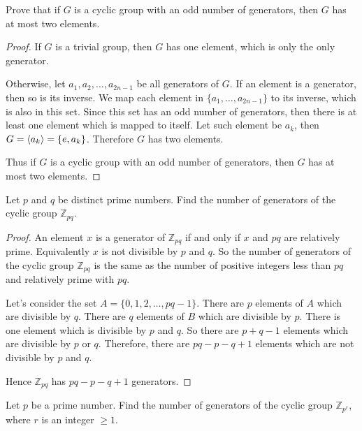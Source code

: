 \begin{exercise}
    Prove that if $G$ is a cyclic group with an odd number of generators, then $G$ has at most two elements.
\end{exercise}

\begin{proof}
    If $G$ is a trivial group, then $G$ has one element, which is only the only generator.

    Otherwise, let $a_{1}, a_{2}, \ldots, a_{2n-1}$ be all generators of $G$. If an element is a generator, then so is its inverse. We map each element in $\{ a_{1}, \ldots, a_{2n-1} \}$ to its inverse, which is also in this set. Since this set has an odd number of generators, then there is at least one element which is mapped to itself. Let such element be $a_{k}$, then $G = \left\langle{a_{k}}\right\rangle = \{ e, a_{k} \}$. Therefore $G$ has two elements.

    Thus if $G$ is a cyclic group with an odd number of generators, then $G$ has at most two elements.
\end{proof}

\begin{exercise}
    Let $p$ and $q$ be distinct prime numbers. Find the number of generators of the cyclic group $\mathbb{Z}_{pq}$.
\end{exercise}

\begin{proof}
    An element $x$ is a generator of $\mathbb{Z}_{pq}$ if and only if $x$ and $pq$ are relatively prime. Equivalently $x$ is not divisible by $p$ and $q$. So the number of generators of the cyclic group $\mathbb{Z}_{pq}$ is the same as the number of positive integers less than $pq$ and relatively prime with $pq$.

    Let's consider the set $A = \{ 0, 1, 2, \ldots, pq - 1 \}$. There are $p$ elements of $A$ which are divisible by $q$. There are $q$ elements of $B$ which are divisible by $p$. There is one element which is divisible by $p$ and $q$. So there are $p + q - 1$ elements which are divisible by $p$ or $q$. Therefore, there are $pq - p - q + 1$ elements which are not divisible by $p$ and $q$.

    Hence $\mathbb{Z}_{pq}$ has $pq - p - q + 1$ generators.
\end{proof}

\begin{exercise}
    Let $p$ be a prime number. Find the number of generators of the cyclic group $\mathbb{Z}_{{p}^{r}}$, where $r$ is an integer $\geq 1$.
\end{exercise}

